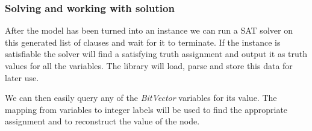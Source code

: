 \subsubsection{Solving and working with solution}
After the model has been turned into an instance we can run a SAT solver on this generated list of clauses and wait for it to terminate.
If the instance is satisfiable the solver will find a satisfying truth assignment and output it as truth values for all the variables.
The library will load, parse and store this data for later use.

We can then easily query any of the \emph{BitVector} variables for its value.
The mapping from variables to integer labels will be used to find the appropriate assignment and to reconstruct the value of the node.